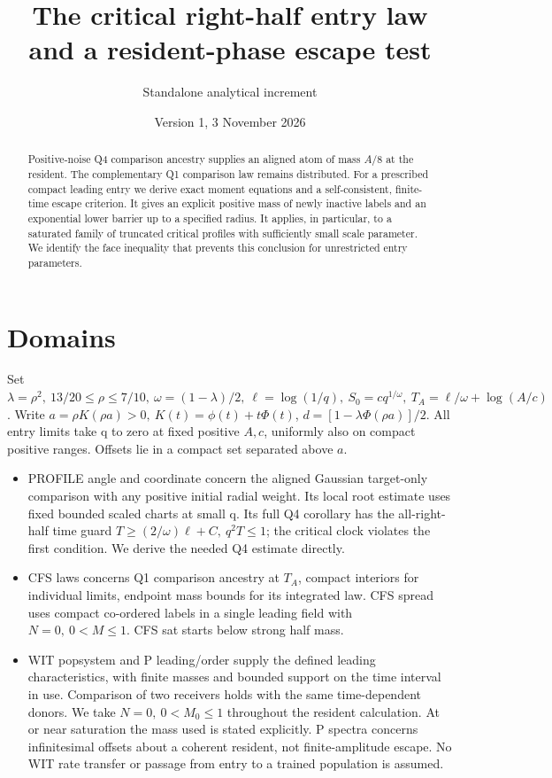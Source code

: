 \documentclass[11pt]{article}
\title{The critical right-half entry law and a resident-phase escape test}
\author{Standalone analytical increment}\date{Version 1, 3 November 2026}
\begin{document}
\maketitle
\begin{abstract}
Positive-noise Q4 comparison ancestry supplies an aligned atom of mass
\(A/8\) at the resident. The complementary Q1 comparison law remains
distributed. For a prescribed compact leading entry we derive exact
moment equations and a self-consistent, finite-time escape criterion.
It gives an explicit positive mass of newly inactive labels and an
exponential lower barrier up to a specified radius. It applies, in
particular, to a saturated family of truncated critical profiles with
sufficiently small scale parameter. We identify the face inequality
that prevents this conclusion for unrestricted entry parameters.
\end{abstract}

\section{Domains}\label{an04rpsv1:domains}
Set \(\lambda=\rho^2,\ 13/20\le\rho\le7/10,\ \omega=(1-\lambda)/2,\ 
\ell=\log(1/q),\ S_0=cq^{1/\omega},\ T_A=\ell/\omega+\log(A/c)\).
Write \(a=\rho K(\rho a)>0,\ K(t)=\phi(t)+t\Phi(t)\),
\(d=[1-\lambda\Phi(\rho a)]/2\). All entry limits take q to zero
at fixed positive \(A,c\), uniformly also on compact positive ranges.
Offsets lie in a compact set separated above \(a\).
\begin{itemize}
\item PROFILE angle and coordinate concern the aligned Gaussian
target-only comparison with any positive initial radial weight. Its
local root estimate uses fixed bounded scaled charts at small q.
Its full Q4 corollary has the all-right-half time guard
\(T\ge(2/\omega)\ell+C,\ q^2T\le1\); the critical clock violates
the first condition. We derive the needed Q4 estimate directly.
\item CFS laws concerns Q1 comparison ancestry at \(T_A\), compact
interiors for individual limits, endpoint mass bounds for its integrated
law. CFS spread uses compact co-ordered labels in a single leading
field with \(N=0,\ 0<M\le1\). CFS sat starts below strong half mass.
\item WIT popsystem and P leading/order supply the defined leading
characteristics, with finite masses and bounded support on the time
interval in use. Comparison of two receivers holds with the same
time-dependent donors. We take \(N=0,\ 0<M_0\le1\) throughout the
resident calculation. At or near saturation the mass used is stated
explicitly. P spectra concerns infinitesimal offsets about a coherent
resident, not finite-amplitude escape. No WIT rate transfer or passage
from entry to a trained population is assumed.
\end{itemize}
\end{document}
